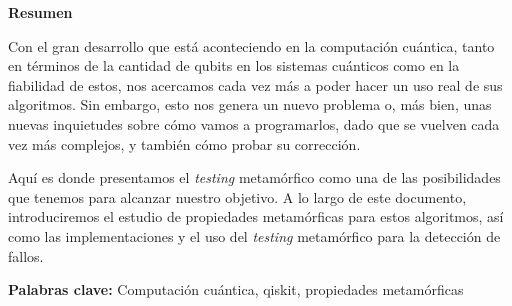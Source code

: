 \newpage

\thispagestyle{empty}

\begin{center}

{\bf \Huge Resumen}

  \end{center}
\vspace{1cm}

 Con el gran desarrollo que está aconteciendo en la computación cuántica, tanto en términos de la cantidad de qubits en los sistemas cuánticos como en la fiabilidad de estos, nos acercamos cada vez más a poder hacer un uso real de sus algoritmos. Sin embargo, esto nos genera un nuevo problema o, más bien, unas nuevas inquietudes sobre cómo vamos a programarlos, dado que se vuelven cada vez más complejos, y también cómo probar su corrección.\newline 
 
 Aquí es donde presentamos el \textit{testing} metamórfico como una de las posibilidades que tenemos para alcanzar nuestro objetivo. A lo largo de este documento, introduciremos el estudio de propiedades metamórficas para estos algoritmos, así como las implementaciones y el uso del \textit{testing} metamórfico para la detección de fallos.

\vspace{2cm}



\textbf{Palabras clave:} Computación cuántica, qiskit, propiedades metamórficas
   
   
   